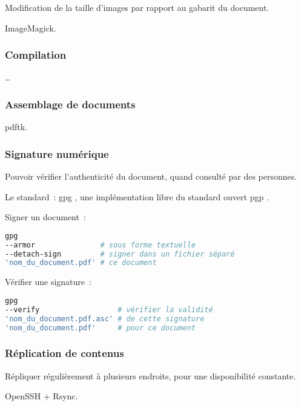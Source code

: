 Modification de la taille d’images par rapport au gabarit du document.

ImageMagick.

\subsubsection{Compilation}

…

\subsubsection{Assemblage de documents}

\gls{pdftk}.

\subsubsection{Signature numérique}

Pouvoir vérifier l’authenticité du document, quand consulté par des personnes.

Le standard : \gls{gpg} \cite{gpg}, une implémentation libre
du standard ouvert \gls{pgp} \cite{pgp}.

Signer un document :
\begin{lstlisting}[language=sh]
gpg
--armor               # sous forme textuelle
--detach-sign         # signer dans un fichier séparé
'nom_du_document.pdf' # ce document
\end{lstlisting}

Vérifier une signature :
\begin{lstlisting}[language=sh]
gpg
--verify                  # vérifier la validité
'nom_du_document.pdf.asc' # de cette signature
'nom_du_document.pdf'     # pour ce document
\end{lstlisting}

\subsubsection{Réplication de contenus}

Répliquer régulièrement à plusieurs endroits, pour une disponibilité constante.

OpenSSH + Rsync.

\pagebreak
